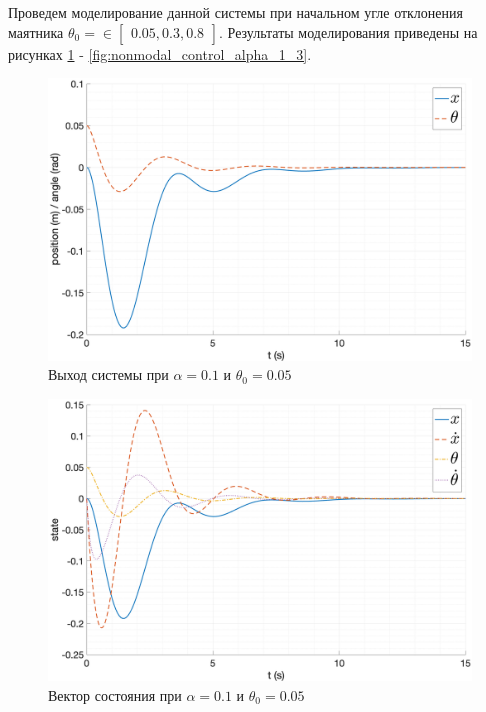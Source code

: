 Проведем моделирование данной системы при начальном угле отклонения маятника $\theta_0 = \in \begin{bmatrix} 0.05, 0.3, 0.8\end{bmatrix}$. 
Результаты моделирования приведены на рисунках \ref{fig:nonmodal_control_alpha_1_1} - \ref{fig:nonmodal_control_alpha_1_3}.
\begin{figure}[ht!]
    \centering
    \includegraphics[width=\textwidth]{media/plots/nonmodal_controlers_min/out_1.png}
    \caption{Выход системы при $\alpha = 0.1$ и $\theta_0 = 0.05$}
    \label{fig:nonmodal_control_alpha_1_1}
\end{figure}
\begin{figure}[ht!]
    \centering
    \includegraphics[width=\textwidth]{media/plots/nonmodal_controlers_min/state_1.png}
    \caption{Вектор состояния при $\alpha = 0.1$ и $\theta_0 = 0.05$}
    \label{fig:nonmodal_control_alpha_1_1_state}
\end{figure}
